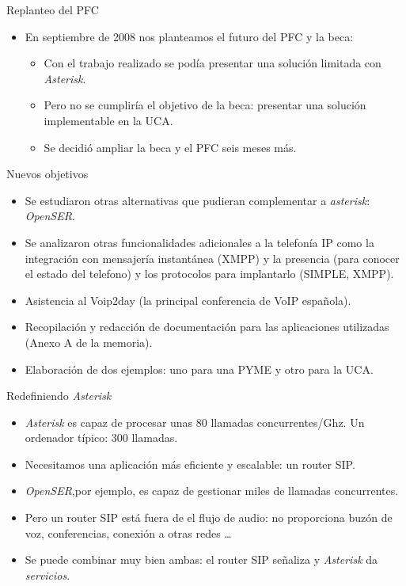 \documentclass{beamer}
\begin{document}
\begin{frame}
  \begin{block}{Replanteo del PFC}
    \begin{itemize}
    \item En septiembre de 2008 nos planteamos el futuro del PFC y la beca:
      \begin{itemize}
      \item Con el trabajo realizado se podía presentar una solución limitada con \emph{Asterisk}.
      \item Pero no se cumpliría el objetivo de la beca: presentar una solución implementable en la UCA.
      \item Se decidió ampliar la beca y el PFC seis meses más.
      \end{itemize}
    \end{itemize}
    
  \end{block}
\end{frame}
  \begin{frame}
  \begin{block}{Nuevos objetivos}
    \begin{itemize}
    \item Se estudiaron otras alternativas que pudieran complementar a \emph{asterisk}: \emph{OpenSER}.
    \item Se analizaron otras funcionalidades adicionales a la telefonía IP como la integración con mensajería instantánea (XMPP) y la presencia (para conocer el estado del telefono) y los protocolos para implantarlo (SIMPLE, XMPP).
    \item Asistencia al Voip2day (la principal conferencia de VoIP española).
    \item Recopilación y redacción de documentación para las aplicaciones utilizadas (Anexo A de la memoria).
    \item Elaboración de dos ejemplos: uno para una PYME y otro para la UCA.
    \end{itemize}
  \end{block}
\end{frame}
\begin{frame}
  \begin{block}{Redefiniendo \emph{Asterisk}}
    \begin{itemize}
    
    
  \item \emph{Asterisk} es capaz de procesar unas 80 llamadas concurrentes/Ghz. Un ordenador típico: 300 llamadas.
  \item Necesitamos una aplicación más eficiente y escalable: un router SIP.
  \item \emph{OpenSER},por ejemplo, es capaz de gestionar miles de llamadas concurrentes.
  \item Pero un router SIP está fuera de el flujo de audio: no proporciona buzón de voz, conferencias, conexión a otras redes \ldots
  \item Se puede combinar muy bien ambas: el router SIP señaliza y \emph{Asterisk} da \emph{servicios}.
  \end{itemize}
  \end{block}
\end{frame}
\end{document}

